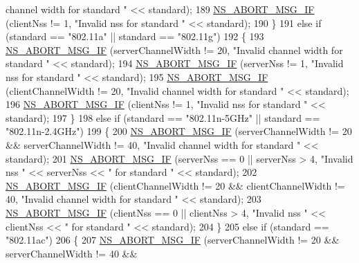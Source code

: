 \begin{DoxyCode}
{       channel width for standard "} << standard);
189       \hyperlink{group__fatal_ga6653324225bc139e46deea177614ceee}{NS\_ABORT\_MSG\_IF} (clientNss != 1, \textcolor{stringliteral}{"Invalid nss for standard "} << standard);
190     \}
191   \textcolor{keywordflow}{else} \textcolor{keywordflow}{if} (standard == \textcolor{stringliteral}{"802.11a"} || standard == \textcolor{stringliteral}{"802.11g"})
192     \{
193       \hyperlink{group__fatal_ga6653324225bc139e46deea177614ceee}{NS\_ABORT\_MSG\_IF} (serverChannelWidth != 20, \textcolor{stringliteral}{"Invalid channel width for standard "} << 
      standard);
194       \hyperlink{group__fatal_ga6653324225bc139e46deea177614ceee}{NS\_ABORT\_MSG\_IF} (serverNss != 1, \textcolor{stringliteral}{"Invalid nss for standard "} << standard);
195       \hyperlink{group__fatal_ga6653324225bc139e46deea177614ceee}{NS\_ABORT\_MSG\_IF} (clientChannelWidth != 20, \textcolor{stringliteral}{"Invalid channel width for standard "} << 
      standard);
196       \hyperlink{group__fatal_ga6653324225bc139e46deea177614ceee}{NS\_ABORT\_MSG\_IF} (clientNss != 1, \textcolor{stringliteral}{"Invalid nss for standard "} << standard);
197     \}
198   \textcolor{keywordflow}{else} \textcolor{keywordflow}{if} (standard == \textcolor{stringliteral}{"802.11n-5GHz"} || standard == \textcolor{stringliteral}{"802.11n-2.4GHz"})
199     \{
200       \hyperlink{group__fatal_ga6653324225bc139e46deea177614ceee}{NS\_ABORT\_MSG\_IF} (serverChannelWidth != 20 && serverChannelWidth != 40, \textcolor{stringliteral}{"Invalid
       channel width for standard "} << standard);
201       \hyperlink{group__fatal_ga6653324225bc139e46deea177614ceee}{NS\_ABORT\_MSG\_IF} (serverNss == 0 || serverNss > 4, \textcolor{stringliteral}{"Invalid nss "} << serverNss << \textcolor{stringliteral}{" for
       standard "} << standard);
202       \hyperlink{group__fatal_ga6653324225bc139e46deea177614ceee}{NS\_ABORT\_MSG\_IF} (clientChannelWidth != 20 && clientChannelWidth != 40, \textcolor{stringliteral}{"Invalid
       channel width for standard "} << standard);
203       \hyperlink{group__fatal_ga6653324225bc139e46deea177614ceee}{NS\_ABORT\_MSG\_IF} (clientNss == 0 || clientNss > 4, \textcolor{stringliteral}{"Invalid nss "} << clientNss << \textcolor{stringliteral}{" for
       standard "} << standard);
204     \}
205   \textcolor{keywordflow}{else} \textcolor{keywordflow}{if} (standard == \textcolor{stringliteral}{"802.11ac"})
206     \{
207       \hyperlink{group__fatal_ga6653324225bc139e46deea177614ceee}{NS\_ABORT\_MSG\_IF} (serverChannelWidth != 20 && serverChannelWidth != 40 && 

\end{DoxyCode}
